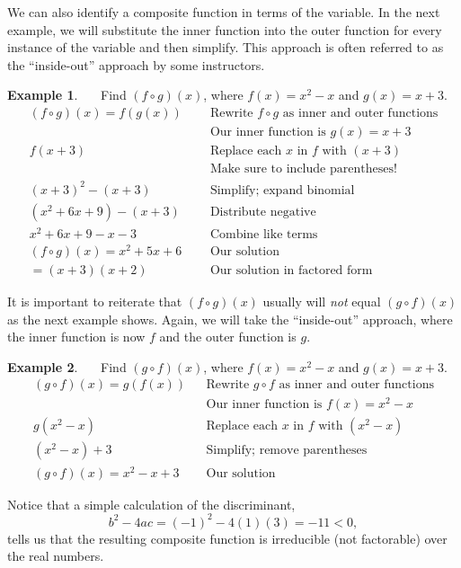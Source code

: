 \documentclass[12pt]{book}
\theoremstyle{definition}
\newtheorem{example}{Example}
\newcommand{\tmop}[1]{\ensuremath{\operatorname{#1}}}
\begin{document}
We can also identify a composite function in terms of the variable. In the next example, we will substitute the inner function into the outer function for every instance of the variable and then simplify.  This approach is often referred to as the ``inside-out'' approach by some instructors.
\begin{example}\label{IO}~~~Find $(f \circ g) (x)$, where $f (x) = x^2 - x$ and $g (x) = x + 3$.
  \begin{eqnarray*}
    (f \circ g) (x)=f (g (x)) &  & \text{Rewrite~} f\circ g \text{~as~inner~and~outer~functions}\\
	    &  & \text{Our~inner~function~is~} g(x) = x + 3\\
    f (x + 3) &  & \text{Replace~each~} x \text{~in~} f \text{~with~} (x + 3)\\
		  &  & \text{Make~sure~to~include~parentheses!}\\
    (x + 3)^2 - (x + 3) &  & \tmop{Simplify;~expand~binomial}\\
    (x^2 + 6 x + 9) - (x + 3) &  & \tmop{Distribute~negative}\\
    x^2 + 6 x + 9 - x - 3~~ &  & \tmop{Combine~like~terms}\\
		(f \circ g) (x)=x^2 + 5 x + 6~~~ &  & \text{Our solution}\\
		=(x+3)(x+2) & & \text{Our~solution~in~factored~form}
  \end{eqnarray*}
\end{example}
It is important to reiterate that $(f \circ g) (x)$ usually will {\it not} equal $(g
\circ f) (x)$ as the next example shows.  Again, we will take the ``inside-out'' approach, where the inner function is now $f$ and the outer function is $g$.
\begin{example}~~~Find $(g \circ f) (x)$, where $f (x) = x^2 - x$ and $g (x) = x + 3$.
  \begin{eqnarray*}
    (g \circ f) (x)=g (f (x)) &  & \text{Rewrite~} g\circ f \text{~as~inner~and~outer~functions}\\
	    &  & \text{Our~inner~function~is~} f(x) = x^2 - x\\
    g (x^2 - x) &  & \text{Replace~each~} x \text{~in~} f \text{~with~} (x^2 - x)\\
    (x^2 - x) + 3 &  & \tmop{Simplify;~remove~parentheses}\\
		(g \circ f) (x)=x^2 - x + 3~~ &  & \text{Our solution}
  \end{eqnarray*}
\end{example}
Notice that a simple calculation of the discriminant, $$b^2-4ac=(-1)^2-4(1)(3)=-11<0,$$ tells us that the resulting composite function is irreducible (not factorable) over the real numbers.\par
\end{document}
